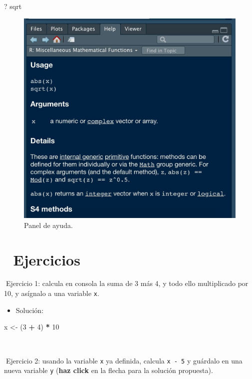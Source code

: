 \documentclass[11pt,]{book}
\newenvironment{Shaded}{\begin{snugshade}}{\end{snugshade}}
\newcommand{\DecValTok}[1]{\textcolor[rgb]{0.06,0.06,0.06}{#1}}
\newcommand{\NormalTok}[1]{#1}
\newcommand{\OperatorTok}[1]{\textcolor[rgb]{0.43,0.43,0.43}{\textbf{#1}}}
\newcommand{\StringTok}[1]{\textcolor[rgb]{0.5,0.5,0.5}{#1}}
\providecommand{\tightlist}{%
  \setlength{\itemsep}{0pt}\setlength{\parskip}{0pt}}
\begin{document}
\begin{Shaded}
\begin{Highlighting}[]
\NormalTok{? sqrt}
\end{Highlighting}
\end{Shaded}

\begin{figure}

{\centering \includegraphics[width=0.5\linewidth]{./img/panel_ayuda} 

}

\caption{Panel de ayuda.}\label{fig:unnamed-chunk-9}
\end{figure}

\hypertarget{ejercicios}{%
\section{📝 Ejercicios}\label{ejercicios}}

📝Ejercicio 1: calcula en consola la suma de 3 más 4, y todo ello multiplicado por 10, y asígnalo a una variable \texttt{x}.

\begin{itemize}
\tightlist
\item
  Solución:
\end{itemize}

\begin{Shaded}
\begin{Highlighting}[]
\NormalTok{x <-}\StringTok{ }\NormalTok{(}\DecValTok{3} \OperatorTok{+}\StringTok{ }\DecValTok{4}\NormalTok{) }\OperatorTok{*}\StringTok{ }\DecValTok{10}
\end{Highlighting}
\end{Shaded}

~

📝Ejercicio 2: usando la variable \texttt{x} ya definida, calcula \texttt{x\ -\ 5} y guárdalo en una nueva variable \texttt{y} (\textbf{haz click} en la flecha para la solución propuesta).
\end{document}
